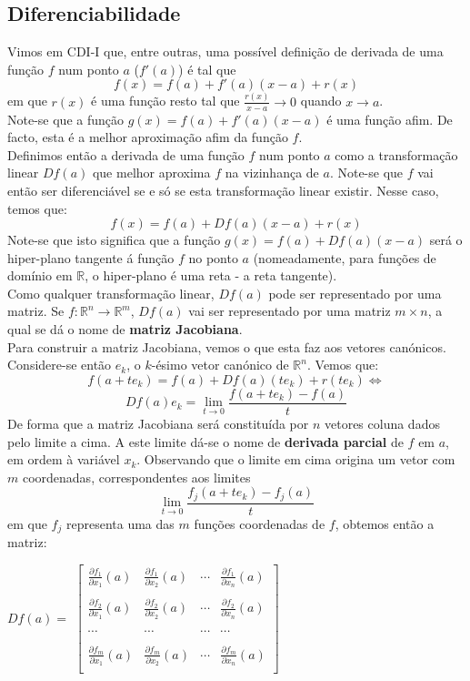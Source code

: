 \documentclass{article}
\begin{document}
\subsection{Diferenciabilidade}
Vimos em CDI-I que, entre outras, uma possível definição de derivada de uma função $f$ num ponto $a$ ($f'(a)$) é tal que 
$$
f(x) = f(a) + f'(a)(x-a) + r(x)
$$
em que $r(x)$ é uma função resto tal que $\frac{r(x)}{x-a} \to 0$ quando $x \to a$.\\
Note-se que a função $g(x) = f(a) + f'(a)(x-a)$ é uma função afim. De facto, esta é a melhor aproximação afim da função $f$.\\ 
Definimos então a derivada de uma função $f$ num ponto $a$ como a transformação linear $Df(a)$ que melhor aproxima $f$ na vizinhança de $a$. Note-se que $f$ vai então ser diferenciável se e só se esta transformação linear existir. Nesse caso, temos que:
$$
f(x) = f(a) + Df(a)(x-a) + r(x)
$$
Note-se que isto significa que a função $g(x) = f(a) + Df(a)(x-a)$ será o hiper-plano tangente á função $f$ no ponto $a$ (nomeadamente, para funções de domínio em $\mathbb{R}$, o hiper-plano é uma reta - a reta tangente).\\
Como qualquer transformação linear, $Df(a)$ pode ser representado por uma matriz. Se $f: \mathbb{R}^n \to \mathbb{R}^m$, $Df(a)$ vai ser representado por uma matriz $m \times n$, a qual se dá o nome de \textbf{matriz Jacobiana}.\\
Para construir a matriz Jacobiana, vemos o que esta faz aos vetores canónicos. Considere-se então $e_k$, o $k$-ésimo vetor canónico de $\mathbb{R}^n$. Vemos que:
$$
f(a + te_k) = f(a) + Df(a)(te_k) + r(te_k) \Leftrightarrow
$$
$$
Df(a)e_k = \lim_{t \to 0} \frac{f(a + te_k)-f(a)}{t}
$$
De forma que a matriz Jacobiana será constituída por $n$ vetores coluna dados pelo limite a cima. A este limite dá-se o nome de \textbf{derivada parcial} de $f$ em $a$, em ordem à variável $x_k$. Observando que o limite em cima origina um vetor com $m$ coordenadas, correspondentes aos limites
$$
\lim_{t \to 0} \frac{f_j(a + te_k)-f_j(a)}{t}
$$
em que $f_j$ representa uma das $m$ funções coordenadas de $f$, obtemos então a matriz:\\
\begin{center}
$Df(a) = $
$\begin{bmatrix}
	\frac{\partial f_1}{\partial x_1}(a) & \frac{\partial f_1}{\partial x_2}(a) & \cdots & 	\frac{\partial f_1}{\partial x_n}(a) \\
	\\
	\frac{\partial f_2}{\partial x_1}(a) & \frac{\partial f_2}{\partial x_2}(a) & \cdots & 	\frac{\partial f_2}{\partial x_n}(a) \\
	\\
	\cdots & \cdots & \cdots & \cdots \\
	\\
	\frac{\partial f_m}{\partial x_1}(a) & \frac{\partial f_m}{\partial x_2}(a) & \cdots & 	\frac{\partial f_m}{\partial x_n}(a) \\
\end{bmatrix}$
\end{center}
\end{document}
